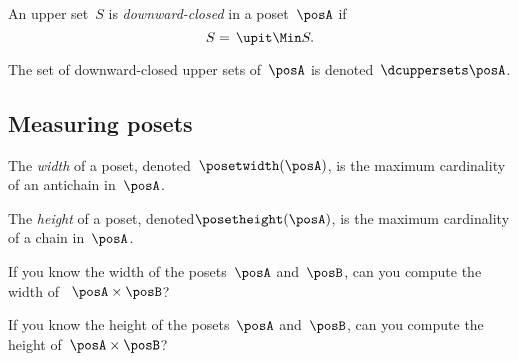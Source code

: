 \begin{definition}
  \label{def:downward-closed-upperset}
  An upper set~$S$ is \emph{downward-closed} in a poset~$\posA$ if
  \begin{equation}
    S =\, \upit  \Min S.
  \end{equation}
\end{definition}

The set of downward-closed upper sets of~$\posA$ is denoted~$\dcuppersets \posA$.

\subsection{Measuring posets}
\begin{definition}
  \label{def:poset-width}
  The \emph{width} of a poset, denoted~$\posetwidth(\posA)$, is the maximum cardinality of an antichain in~$\posA$.
\end{definition}


\begin{definition}
  \label{def:poset-height}
  The \emph{height} of a poset, denoted$\posetheight(\posA)$, is the maximum cardinality of a chain in~$\posA$.
\end{definition}

\begin{exercise}\label{ex:width}
  If you know the width of the posets~$\posA$ and~$\posB$, can you compute the width of ~$\posA\times\posB$?
\end{exercise}
\begin{solution}
\end{solution}

\begin{exercise}\label{ex:height}
  If you know the height of the posets~$\posA$ and~$\posB$, can you compute the height of~$\posA\times\posB$?
\end{exercise}
\begin{solution}
\end{solution}

